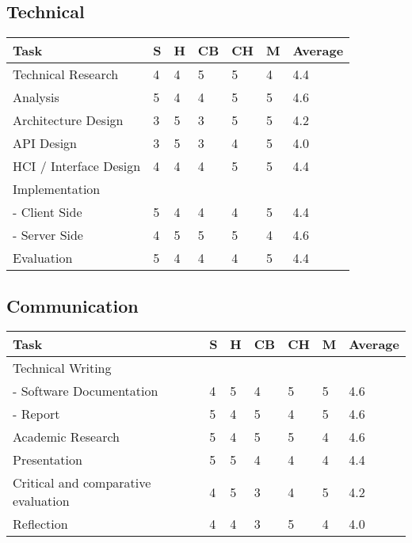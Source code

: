 \subsection{Technical} 
\begin{tabular}{ l || l | l | l | l | l || l}
  Task & S & H & CB & CH & M & Average \\ \hline
  Technical Research &  4  &  4  &  5  &  5  &  4  &  4.4 \\
  Analysis &  5  &  4  &  4  &  5  &  5  &  4.6 \\
  Architecture Design &  3  &  5  &  3  &  5  &  5  &  4.2 \\
  API Design &  3  &  5  &  3  &  4  &  5  &  4.0 \\
  HCI / Interface Design &  4  &  4  &  4  &  5  &  5  &  4.4 \\
  Implementation \\
   - Client Side &  5  &  4  &  4  &  4  &  5  &  4.4 \\
   - Server Side &  4  &  5  &  5  &  5  &  4  &  4.6 \\
  Evaluation &  5  &  4  &  4  &  4  &  5  &  4.4 \\
\end{tabular}

\subsection{Communication} 
\begin{tabular}{ l || l | l | l | l | l || l}
  Task & S & H & CB & CH & M & Average \\ \hline
  Technical Writing\\ 
   - Software Documentation &  4  &  5  &  4  &  5  &  5  &  4.6 \\
   - Report &  5  &  4  &  5  &  4  &  5  &  4.6 \\
  Academic Research &  5  &  4  &  5  &  5  &  4  &  4.6 \\
  Presentation &  5  &  5  &  4  &  4  &  4  &  4.4 \\
  Critical and comparative evaluation &  4  &  5  &  3  &  4  &  5  &  4.2 \\
  Reflection &  4  &  4  &  3  &  5  &  4  &  4.0 \\
\end{tabular}